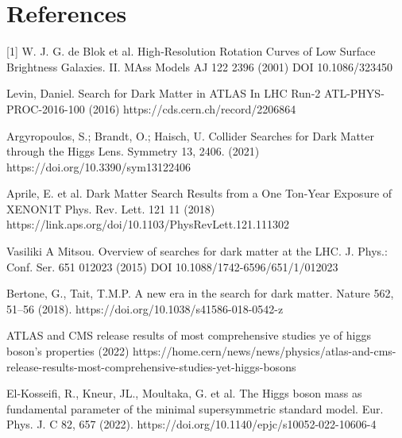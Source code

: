 \documentclass[]{article}
\begin{document}
\newpage

\section*{References}

[1] W. J. G. de Blok et al. High-Resolution Rotation Curves of Low Surface Brightness
Galaxies. II. MAss Models AJ 122 2396 (2001) DOI 10.1086/323450

\par
\noindent
[2] Levin, Daniel. Search for Dark Matter in ATLAS In LHC Run-2
ATL-PHYS-PROC-2016-100 (2016) https://cds.cern.ch/record/2206864




\par
\noindent
[3] Argyropoulos, S.; Brandt, O.; Haisch, U. Collider Searches for Dark Matter 
through the Higgs Lens. Symmetry 13, 2406. (2021)
https://doi.org/10.3390/sym13122406 \par
\noindent
[4] Aprile, E. et al. Dark Matter Search Results from a One Ton-Year Exposure of XENON1T
Phys. Rev. Lett. 121 11 (2018) https://link.aps.org/doi/10.1103/PhysRevLett.121.111302


\par
\noindent
[5] Vasiliki A Mitsou. Overview of searches for dark matter at the LHC. J. Phys.: Conf. Ser. 651 012023 (2015) 
DOI 10.1088/1742-6596/651/1/012023

\par
\noindent
[6] Bertone, G., Tait, T.M.P. A new era in the search for dark matter. 
Nature 562, 51–56 (2018). https://doi.org/10.1038/s41586-018-0542-z
\par
\noindent
[7] ATLAS and CMS release results of most comprehensive studies ye of higgs boson's
properties (2022)
https://home.cern/news/news/physics/atlas-and-cms-release-results-most-comprehensive-studies-yet-higgs-bosons
\par
\noindent
[8] El-Kosseifi, R., Kneur, JL., Moultaka, G. et al. The Higgs boson mass as 
fundamental parameter of the minimal supersymmetric standard model. Eur. Phys. 
J. C 82, 657 (2022). https://doi.org/10.1140/epjc/s10052-022-10606-4 
\end{document}
